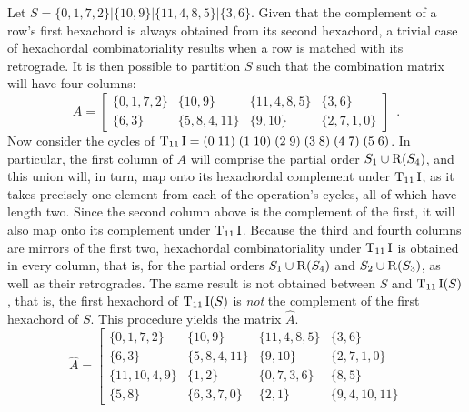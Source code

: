 \begin{example}
	\cite[224]{Starr1984}
	\label{ex:starr-algorithm-2}
    Let $S = \{ 0, 1, 7, 2 \} | \{ 10, 9 \} | \{ 11, 4, 8, 5 \} | \{ 3, 6 \}$. Given that the complement of a row's first hexachord is always obtained from its second hexachord, a trivial case of hexachordal combinatoriality results when a row is matched with its retrograde. It is then possible to partition $S$ such that the combination matrix will have four columns:
    \begin{equation}
        A = \left[
        \begin{array}{c|c|c|c}
        	\{ 0, 1, 7, 2 \} & \{ 10, 9 \} & \{ 11, 4, 8, 5 \} & \{ 3, 6 \} \\
        	\{ 6, 3 \} & \{ 5, 8, 4, 11 \} & \{ 9, 10 \} & \{ 2, 7, 1, 0 \}
        \end{array}
        \right] \enspace.
    \end{equation}
    Now consider the cycles of $\operatorname{T}_{11}\operatorname{I} = (0 \; 11) \; (1 \; 10) \; (2 \; 9) \; (3 \; 8) \; (4 \; 7) \; (5 \; 6)$. In particular, the first column of $A$ will comprise the partial order $S_1 \cup \operatorname{R}(S_4)$, and this union will, in turn, map onto its hexachordal complement under $\operatorname{T}_{11}\operatorname{I}$, as it takes precisely one element from each of the operation's cycles, all of which have length two. Since the second column above is the complement of the first, it will also map onto its complement under $\operatorname{T}_{11}\operatorname{I}$. Because the third and fourth columns are mirrors of the first two, hexachordal combinatoriality under $\operatorname{T}_{11}\operatorname{I}$ is obtained in every column, that is, for the partial orders $S_1 \cup \operatorname{R}(S_4)$ and $S_2 \cup \operatorname{R}(S_3)$, as well as their retrogrades. The same result is not obtained between $S$ and $\operatorname{T}_{11}\operatorname{I}(S)$, that is, the first hexachord of $\operatorname{T}_{11}\operatorname{I}(S)$ is \emph{not} the complement of the first hexachord of $S$. This procedure yields the matrix $\hat{A}$.
    \begin{equation}
        \hat{A} = \left[
        \begin{array}{c|c|c|c}
        	\{ 0, 1, 7, 2 \} & \{ 10, 9 \} & \{ 11, 4, 8, 5 \} & \{ 3, 6 \} \\
        	\{ 6, 3 \} & \{ 5, 8, 4, 11 \} & \{ 9, 10 \} & \{ 2, 7, 1, 0 \} \\
        	\{ 11, 10, 4, 9 \} & \{ 1, 2 \} & \{ 0, 7, 3, 6 \} & \{ 8, 5 \} \\
        	\{ 5, 8 \} & \{ 6, 3, 7, 0 \} & \{ 2, 1 \} & \{ 9, 4, 10, 11 \}
        \end{array}

\end{equation}
\end{example}

